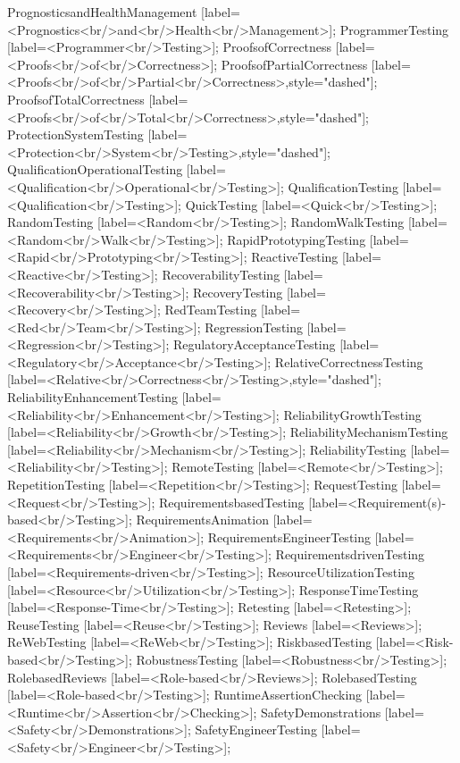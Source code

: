 \documentclass{article}
\begin{document}
{PrognosticsandHealthManagement [label=<Prognostics<br/>and<br/>Health<br/>Management>];
ProgrammerTesting [label=<Programmer<br/>Testing>];
ProofsofCorrectness [label=<Proofs<br/>of<br/>Correctness>];
ProofsofPartialCorrectness [label=<Proofs<br/>of<br/>Partial<br/>Correctness>,style="dashed"];
ProofsofTotalCorrectness [label=<Proofs<br/>of<br/>Total<br/>Correctness>,style="dashed"];
ProtectionSystemTesting [label=<Protection<br/>System<br/>Testing>,style="dashed"];
QualificationOperationalTesting [label=<Qualification<br/>Operational<br/>Testing>];
QualificationTesting [label=<Qualification<br/>Testing>];
QuickTesting [label=<Quick<br/>Testing>];
RandomTesting [label=<Random<br/>Testing>];
RandomWalkTesting [label=<Random<br/>Walk<br/>Testing>];
RapidPrototypingTesting [label=<Rapid<br/>Prototyping<br/>Testing>];
ReactiveTesting [label=<Reactive<br/>Testing>];
RecoverabilityTesting [label=<Recoverability<br/>Testing>];
RecoveryTesting [label=<Recovery<br/>Testing>];
RedTeamTesting [label=<Red<br/>Team<br/>Testing>];
RegressionTesting [label=<Regression<br/>Testing>];
RegulatoryAcceptanceTesting [label=<Regulatory<br/>Acceptance<br/>Testing>];
RelativeCorrectnessTesting [label=<Relative<br/>Correctness<br/>Testing>,style="dashed"];
ReliabilityEnhancementTesting [label=<Reliability<br/>Enhancement<br/>Testing>];
ReliabilityGrowthTesting [label=<Reliability<br/>Growth<br/>Testing>];
ReliabilityMechanismTesting [label=<Reliability<br/>Mechanism<br/>Testing>];
ReliabilityTesting [label=<Reliability<br/>Testing>];
RemoteTesting [label=<Remote<br/>Testing>];
RepetitionTesting [label=<Repetition<br/>Testing>];
RequestTesting [label=<Request<br/>Testing>];
RequirementsbasedTesting [label=<Requirement(s)-based<br/>Testing>];
RequirementsAnimation [label=<Requirements<br/>Animation>];
RequirementsEngineerTesting [label=<Requirements<br/>Engineer<br/>Testing>];
RequirementsdrivenTesting [label=<Requirements-driven<br/>Testing>];
ResourceUtilizationTesting [label=<Resource<br/>Utilization<br/>Testing>];
ResponseTimeTesting [label=<Response-Time<br/>Testing>];
Retesting [label=<Retesting>];
ReuseTesting [label=<Reuse<br/>Testing>];
Reviews [label=<Reviews>];
ReWebTesting [label=<ReWeb<br/>Testing>];
RiskbasedTesting [label=<Risk-based<br/>Testing>];
RobustnessTesting [label=<Robustness<br/>Testing>];
RolebasedReviews [label=<Role-based<br/>Reviews>];
RolebasedTesting [label=<Role-based<br/>Testing>];
RuntimeAssertionChecking [label=<Runtime<br/>Assertion<br/>Checking>];
SafetyDemonstrations [label=<Safety<br/>Demonstrations>];
SafetyEngineerTesting [label=<Safety<br/>Engineer<br/>Testing>];
}
\end{document}
